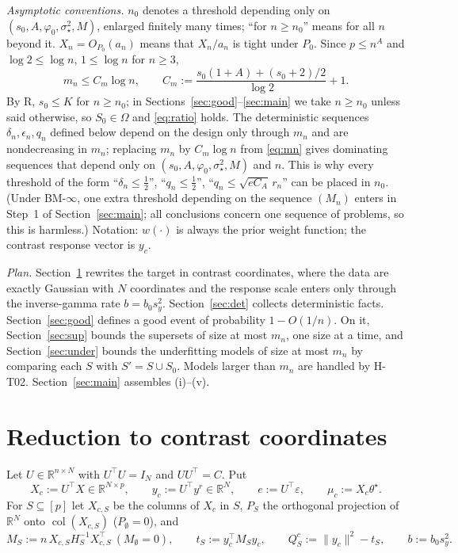 \documentclass[11pt]{article}
\theoremstyle{definition}
\newcommand{\Pp}{P_0}
\newcommand{\1}{\mathbf 1}
\newcommand{\R}{\mathbb R}
\newcommand{\sst}{\sigma_\star^2}
\newcommand{\tr}{^{\top}}
\begin{document}
\emph{Asymptotic conventions.} $n_0$ denotes a threshold depending only on $(s_0,A,\varphi_0,\sst,M)$, enlarged finitely many times; ``for $n\ge n_0$'' means for all $n$ beyond it. $X_n=O_{\Pp}(a_n)$ means that $X_n/a_n$ is tight under $\Pp$. Since $p\le n^A$ and $\log2\le\log n$, $1\le\log n$ for $n\ge3$,
\begin{equation}\label{eq:mn}
m_n\le C_m\log n,\qquad C_m:=\frac{s_0(1+A)+(s_0+2)/2}{\log2}+1 .
\end{equation}
By R, $s_0\le K$ for $n\ge n_0$; in Sections~\ref{sec:good}--\ref{sec:main} we take $n\ge n_0$ unless said otherwise, so $S_0\in\Omega$ and \eqref{eq:ratio} holds. The deterministic sequences $\delta_n,\epsilon_n,q_n$ defined below depend on the design only through $m_n$ and are nondecreasing in $m_n$; replacing $m_n$ by $C_m\log n$ from \eqref{eq:mn} gives dominating sequences that depend only on $(s_0,A,\varphi_0,\sst,M)$ and $n$. This is why every threshold of the form ``$\delta_n\le\frac12$'', ``$q_n\le\frac12$'', ``$q_n\le\sqrt{eC_A}\,r_n$'' can be placed in $n_0$. (Under BM-$\infty$, one extra threshold depending on the sequence $(M_n)$ enters in Step~1 of Section~\ref{sec:main}; all conclusions concern one sequence of problems, so this is harmless.) Notation: $w(\cdot)$ is always the prior weight function; the contrast response vector is $y_c$.

\emph{Plan.} Section~\ref{sec:red} rewrites the target in contrast coordinates, where the data are exactly Gaussian with $N$ coordinates and the response scale enters only through the inverse-gamma rate $b=b_0s_y^2$. Section~\ref{sec:det} collects deterministic facts. Section~\ref{sec:good} defines a good event of probability $1-O(1/n)$. On it, Section~\ref{sec:sup} bounds the supersets of size at most $m_n$, one size at a time, and Section~\ref{sec:under} bounds the underfitting models of size at most $m_n$ by comparing each $S$ with $S'=S\cup S_0$. Models larger than $m_n$ are handled by H-T02. Section~\ref{sec:main} assembles (i)--(v).

\section{Reduction to contrast coordinates}\label{sec:red}

Let $U\in\R^{n\times N}$ with $U\tr U=I_N$ and $UU\tr=C$. Put
\[
X_c:=U\tr X\in\R^{N\times p},\qquad y_c:=U\tr y^r\in\R^N,\qquad e:=U\tr\varepsilon,\qquad \mu_c:=X_c\theta^\star .
\]
For $S\subseteq[p]$ let $X_{c,S}$ be the columns of $X_c$ in $S$, $P_S$ the orthogonal projection of $\R^N$ onto $\operatorname{col}(X_{c,S})$ ($P_\emptyset=0$), and
\[
M_S:=n\,X_{c,S}H_S^{-1}X_{c,S}\tr\ (M_\emptyset=0),\qquad t_S:=y_c\tr M_Sy_c,\qquad Q^c_S:=\|y_c\|^2-t_S,\qquad b:=b_0s_y^2 .
\]
\end{document}

